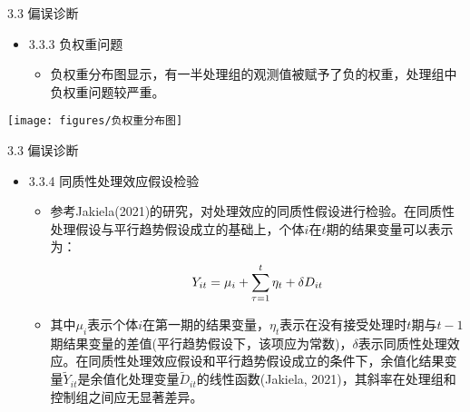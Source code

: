 \documentclass{beamer}%
\begin{document}
\begin{frame}[t]{\large 3.3 偏误诊断}
\begin{itemize}
  \item 3.3.3 负权重问题
\begin{itemize}
  \item 负权重分布图显示，有一半处理组的观测值被赋予了负的权重，处理组中负权重问题较严重。
  \end{itemize}
\end{itemize}
\vspace{-0.4cm} %
\begin{center}
	\texttt{[image: figures/负权重分布图]}
\end{center}
\end{frame}



\begin{frame}[t]{\large 3.3 偏误诊断}
\begin{itemize}
  \item 3.3.4 同质性处理效应假设检验
 \begin{itemize}
  \item 参考Jakiela(2021)的研究，对处理效应的同质性假设进行检验。在同质性处理假设与平行趋势假设成立的基础上，个体$i$在$t$期的结果变量可以表示为：
    \begin{equation}
    \setlength{\abovedisplayskip}{2pt}
    \setlength{\belowdisplayskip}{2pt}
    Y_{i t}=\mu_i+\sum_{\tau=1}^t \eta_t+\delta D_{i t}
    \end{equation}
  \item 其中$\mu_i$表示个体$i$在第一期的结果变量，$\eta_t$表示在没有接受处理时$t$期与$t-1$期结果变量的差值(平行趋势假设下，该项应为常数)，$\delta$表示同质性处理效应。在同质性处理效应假设和平行趋势假设成立的条件下，余值化结果变量$\widetilde{Y}_{it}$是余值化处理变量$\widetilde{D}_{it}$的线性函数(Jakiela, 2021)，其斜率在处理组和控制组之间应无显著差异。
  \end{itemize}
\end{itemize}
\end{frame}
\end{document}
